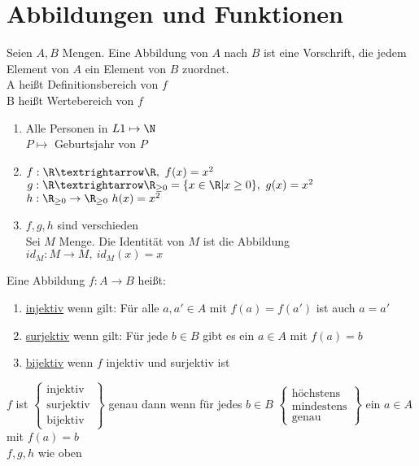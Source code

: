 %
\chapter{Abbildungen und Funktionen}
Seien $A, B$ Mengen. Eine Abbildung von $A$ nach $B$ ist eine Vorschrift, die jedem Element von $A$ ein Element von $B$ zuordnet.\\
%
A heißt Definitionsbereich von $f$\\
B heißt Wertebereich von $f$
%
\bsp
\begin{enumerate}
\item {Alle Personen in $L1 \mapsto \N$\\
$P \mapsto$ Geburtsjahr von $P$}
%
\item{$f:\R → \R, \ f(x)=x^2$\\
$g:\R→\R_{\geq 0}=\{x\in\R|x\geq 0\}, \ g(x)=x^2$\\
$h: \R_{\geq 0} \to \R_{\geq 0} \ h(x) = x^2$}
\bem 
\item{
$f,g,h$ sind verschieden\\
Sei $M$ Menge. Die Identität von $M$ ist die Abbildung $id_{M}:M→M, \ id_M(x)=x$}
\end{enumerate}
%
%
Eine Abbildung $f: A \to B$ heißt:
%
\begin{enumerate}
\item{\underline{injektiv} wenn gilt: Für alle $a, a' \in A$ mit $f(a) = f(a')$ ist auch $a = a'$}
\item{\underline{surjektiv} wenn gilt: Für jede $b\in B$ gibt es ein $a\in A$ mit $f(a)=b$}
\item{\underline{bijektiv} wenn $f$ injektiv und surjektiv ist}
\end{enumerate}
%
%
%
\bem
$f$ ist $\left\{
\begin{array}{c}
\text{injektiv}\\
\text{surjektiv}\\
\text{bijektiv}
\end{array}
 \right\}$ genau dann wenn für jedes $b \in B$ $\left\{\begin{array}{c} \text{höchstens}\\ \text{mindestens}\\ \text{genau} \end{array} \right\}$ ein $a \in A$ mit $f(a) = b$\\
%
\bsp
$f,g,h$ wie oben\\

